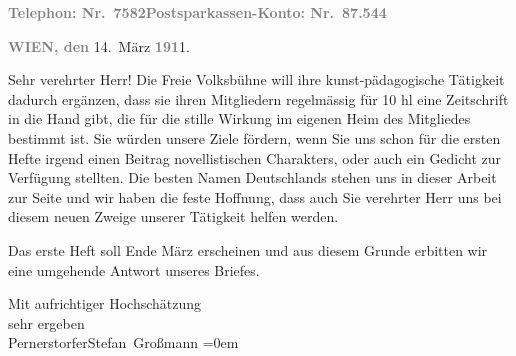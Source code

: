 \pstart
           \textcolor{gray}{\textbf{Telephon: Nr. 7582}}\hfill \textcolor{gray}{\textbf{Postsparkassen-Konto: Nr. 87.544}}\pend
           
\pstart
           \raggedleft{}\textcolor{gray}{\textbf{WIEN, den}}{ }14. März \textcolor{gray}{\textbf{191}}1.\pend
           
\pstart\center{}Sehr verehrter Herr!\pend\vspace{0.5em}
\pstart
           Die Freie Volksbühne will ihre kunst-pädagogische
               Tätigkeit dadurch ergänzen, dass sie ihren Mitgliedern regelmässig für 10 hl eine Zeitschrift in die Hand gibt,
               die für die stille Wirkung im eigenen Heim des Mitgliedes bestimmt ist. Sie würden
               unsere Ziele fördern, wenn Sie uns schon für die ersten Hefte irgend einen Beitrag
               novellistischen Charakters, oder auch ein Gedicht zur Verfügung stellten. Die besten
               Namen Deutschlands stehen uns in dieser Arbeit zur Seite und wir haben die feste
               Hoffnung, dass auch Sie verehrter Herr uns bei diesem neuen Zweige unserer Tätigkeit
               helfen werden.\pend
           
\pstart
           Das erste Heft soll Ende März erscheinen und aus diesem Grunde erbitten wir eine umgehende Antwort
               unseres Briefes.\pend
           
\pstart
           Mit aufrichtiger Hochschätzung{\\[\baselineskip]} sehr ergeben{\\[\baselineskip]}\spacefill\mbox{Pernerstorfer}\hspace*{1.5em}\spacefill\mbox{Stefan Großmann}\pend
           \leftskip=0em{}\endnumbering{}  \newcommand{\dateiname}{L02013}\newcommand{\titel}{Engelbert Pernerstorfer und Stefan Großmann an Arthur Schnitzler, 14. 3. 1911}\newcommand{\editorInnen}{Martin Anton Müller und Gerd-Hermann Susen}
